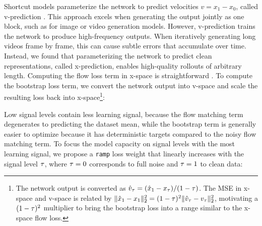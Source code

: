 \documentclass[11pt]{article}
\begin{document}

Shortcut models parameterize the network to predict velocities $v = x_1 - x_0$, called v-prediction \citep{kingma2023understanding}.
This approach excels when generating the output jointly as one block, such as for image or video generation models.
However, v-prediction trains the network to produce high-frequency outputs.
When iteratively generating long videos frame by frame, this can cause subtle errors that accumulate over time.
Instead, we found that parameterizing the network to predict clean representations, called x-prediction, enables high-quality rollouts of arbitrary length.
Computing the flow loss term in x-space is straightforward \citep{kingma2023understanding}. To compute the bootstrap loss term, we convert the network output into v-space and scale the resulting loss back into x-space\footnote{
The network output is converted as $\hat{v}_\tau = (\hat{x}_1 - x_\tau) / (1 - \tau)$. The MSE in x-space and v-space is related by $\|\hat{x}_1 - x_1\|^2_2 = (1-\tau)^2\|\hat{v}_\tau-v_\tau\|^2_2$, motivating a $(1-\tau)^2$ multiplier to bring the bootstrap loss into a range similar to the x-space flow loss.}:


Low signal levels contain less learning signal, because the flow matching term degenerates to predicting the dataset mean, while the bootstrap term is generally easier to optimize because it has deterministic targets compared to the noisy flow matching term.
To focus the model capacity on signal levels with the most learning signal, we propose a \texttt{ramp} loss weight that linearly increases with the signal level $\tau$, where $\tau=0$ corresponds to full noise and $\tau=1$ to clean data:
\end{document}
